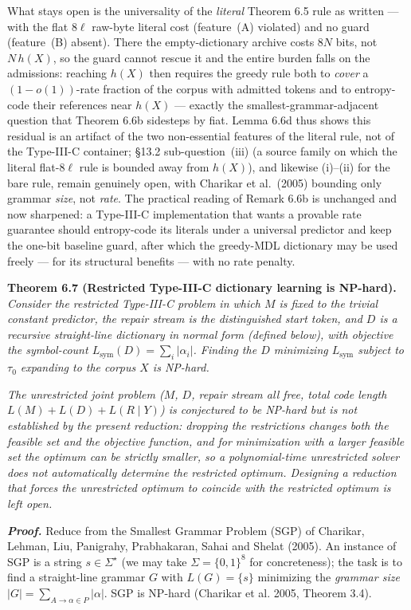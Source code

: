 \documentclass[
]{article}
\begin{document}
What stays open is the universality of the \emph{literal} Theorem 6.5
rule as written --- with the flat $8\ell$ raw-byte literal cost
(feature~(A) violated) and no guard (feature~(B) absent). There the
empty-dictionary archive costs $8N$ bits, not $N\,h(X)$, so the guard
cannot rescue it and the entire burden falls on the admissions: reaching
$h(X)$ then requires the greedy rule both to \emph{cover} a
$(1-o(1))$-rate fraction of the corpus with admitted tokens and to
entropy-code their references near $h(X)$ --- exactly the
smallest-grammar-adjacent question that Theorem 6.6b sidesteps by fiat.
Lemma 6.6d thus shows this residual is an artifact of the two
non-essential features of the literal rule, not of the Type-III-C
container; \S13.2 sub-question~(iii) (a source family on which
the literal flat-$8\ell$ rule is bounded away from $h(X)$), and likewise
(i)--(ii) for the bare rule, remain
genuinely open, with Charikar et al.\ (2005) bounding only grammar
\emph{size}, not \emph{rate}. The practical reading of Remark 6.6b is
unchanged and now sharpened: a Type-III-C implementation that wants a
provable rate guarantee should entropy-code its literals under a
universal predictor and keep the one-bit baseline guard, after which the
greedy-MDL dictionary may be used freely --- for its structural benefits
--- with no rate penalty.

\textbf{Theorem 6.7 (Restricted Type-III-C dictionary learning is
NP-hard).} \emph{Consider the restricted Type-III-C problem in which
$M$ is fixed to the trivial constant predictor, the repair stream is
the distinguished start token, and $D$ is a recursive straight-line
dictionary in normal form (defined below), with objective the
symbol-count $L_{\mathrm{sym}}(D) = \sum_i |\alpha_i|$. Finding the
$D$ minimizing $L_{\mathrm{sym}}$ subject to $\tau_0$ expanding to
the corpus $X$ is NP-hard.}

\emph{The unrestricted joint problem ($M$, $D$, repair stream all
free, total code length $L(M) + L(D) + L(R\mid Y)$) is conjectured
to be NP-hard but is not established by the present reduction:
dropping the restrictions changes both the feasible set and the
objective function, and for minimization with a larger feasible set
the optimum can be strictly smaller, so a polynomial-time
unrestricted solver does not automatically determine the restricted
optimum. Designing a reduction that forces the unrestricted optimum
to coincide with the restricted optimum is left open.}

\emph{\textbf{Proof.}} Reduce from the Smallest Grammar Problem (SGP)
of Charikar, Lehman, Liu, Panigrahy, Prabhakaran, Sahai and Shelat
(2005). An instance of SGP is a string $s \in \Sigma^\star$ (we may
take $\Sigma = \{0,1\}^8$ for concreteness); the task is to find a
straight-line grammar $G$ with $L(G) = \{s\}$ minimizing the
\emph{grammar size}
$|G| = \sum_{A \to \alpha \in P} |\alpha|$. SGP is NP-hard (Charikar
et al. 2005, Theorem 3.4).
\end{document}
